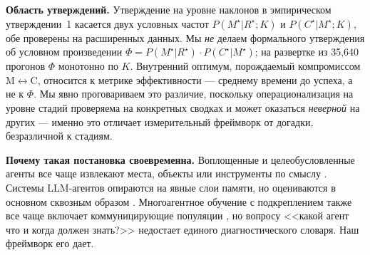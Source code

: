 \documentclass{article}
\begin{document}
\textbf{Область утверждений.} Утверждение на уровне наклонов в эмпирическом утверждении~1 касается двух условных частот $P(M^\star|R^\star;K)$ и $P(C^\star|M^\star;K)$, обе проверены на расширенных данных. Мы \emph{не} делаем формального утверждения об условном произведении $\Phi = P(M^\star|R^\star)\!\cdot\!P(C^\star|M^\star)$; на развертке из 35{,}640 прогонов $\Phi$ монотонно по $K$. Внутренний оптимум, порождаемый компромиссом M$\leftrightarrow$C, относится к метрике эффективности --- среднему времени до успеха, а не к $\Phi$. Мы явно проговариваем это различие, поскольку операционализация на уровне стадий проверяема на конкретных сводках и может оказаться \emph{неверной} на других --- именно это отличает измерительный фреймворк от догадки, безразличной к стадиям.

\textbf{Почему такая постановка своевременна.} Воплощенные и целеобусловленные
агенты все чаще извлекают места, объекты или инструменты по смыслу
\citep{andrychowicz2017hindsight,ghosh2021learning,savva2019habitat}.
Системы LLM-агентов опираются на явные слои памяти, но оцениваются в основном
сквозным образом \citep{wang2023voyager,shinn2023reflexion,packer2023memgpt}.
Многоагентное обучение с подкреплением также все чаще включает
коммуницирующие популяции \citep{lowe2017maddpg,foerster2018ctde}, но
вопросу <<какой агент что и когда должен знать?>> недостает
единого диагностического словаря. Наш фреймворк его дает.
\end{document}
